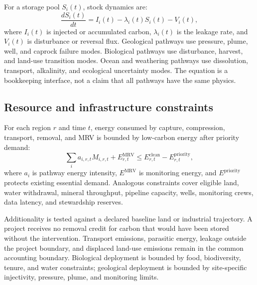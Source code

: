 \documentclass[conference]{IEEEtran}
\begin{document}
For a storage pool $S_i(t)$, stock dynamics are:
\begin{equation}
\frac{dS_i(t)}{dt}=I_i(t)-\lambda_i(t)S_i(t)-V_i(t),
\label{eq:stock}
\end{equation}
where $I_i(t)$ is injected or accumulated carbon, $\lambda_i(t)$ is the leakage rate, and $V_i(t)$ is disturbance or reversal flux. Geological pathways use pressure, plume, well, and caprock failure modes. Biological pathways use disturbance, harvest, and land-use transition modes. Ocean and weathering pathways use dissolution, transport, alkalinity, and ecological uncertainty modes. The equation is a bookkeeping interface, not a claim that all pathways have the same physics.

\subsection{Resource and infrastructure constraints}
For each region $r$ and time $t$, energy consumed by capture, compression, transport, removal, and MRV is bounded by low-carbon energy after priority demand:
\begin{equation}
\sum_i a_{i,r,t}M_{i,r,t}+E^{\mathrm{MRV}}_{r,t}
\leq E^{\mathrm{clean}}_{r,t}-E^{\mathrm{priority}}_{r,t},
\label{eq:energy}
\end{equation}
where $a_i$ is pathway energy intensity, $E^{\mathrm{MRV}}$ is monitoring energy, and $E^{\mathrm{priority}}$ protects existing essential demand. Analogous constraints cover eligible land, water withdrawal, mineral throughput, pipeline capacity, wells, monitoring crews, data latency, and stewardship reserves.

Additionality is tested against a declared baseline land or industrial trajectory. A project receives no removal credit for carbon that would have been stored without the intervention. Transport emissions, parasitic energy, leakage outside the project boundary, and displaced land-use emissions remain in the common accounting boundary. Biological deployment is bounded by food, biodiversity, tenure, and water constraints; geological deployment is bounded by site-specific injectivity, pressure, plume, and monitoring limits.
\end{document}
